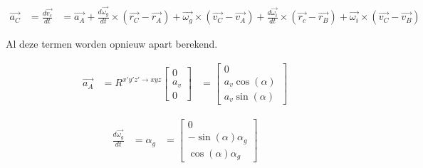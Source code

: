 \begin{equation}
\begin{split}
\overrightarrow{a_{C}}&=\frac{d\overrightarrow{v_{c}}}{dt}
&=	\overrightarrow{a_{A}} + \frac{d\overrightarrow{\omega_{g}}}{dt}\times(\overrightarrow{r_{C}}-\overrightarrow{r_{A}}) + \overrightarrow{\omega_{g}}\times(\overrightarrow{v_{C}}-\overrightarrow{v_{A}}) + \frac{d\overrightarrow{\omega_i}}{dt}\times(\overrightarrow{r_{c}}-\overrightarrow{r_{B}})+\overrightarrow{\omega_{i}}\times(\overrightarrow{v_{C}}-\overrightarrow{v_{B}})
\end{split}
\end{equation}

Al deze termen worden opnieuw apart berekend.

\begin{equation*}
\begin{split}
\overrightarrow{a_{A}}
&=R^{x'y'z' \rightarrow xyz}
	\begin{bmatrix}
	0\\
	a_v\\
	0
	\end{bmatrix}
&=	\begin{bmatrix}
	0\\
	a_v\cos(\alpha)\\
	a_v\sin(\alpha)\
	\end{bmatrix}
\end{split}
\end{equation*}

\begin{equation*}
\begin{split}
\frac{d\overrightarrow{\omega_g}}{dt}&=\alpha_{g}
&=	\begin{bmatrix}
	0\\
	-\sin(\alpha)\alpha_{g}\\
	\cos(\alpha)\alpha_{g}\
	\end{bmatrix}
\end{split}
\end{equation*}

